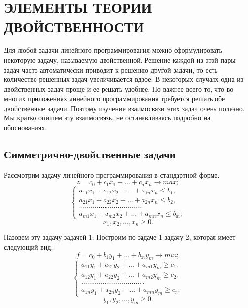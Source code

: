 \section{ЭЛЕМЕНТЫ ТЕОРИИ ДВОЙСТВЕННОСТИ}

Для любой задачи линейного программирования можно сформулировать некоторую задачу, называемую двойственной. Решение каждой из этой пары задач часто  автоматически приводит к решению другой задачи, то есть количество решенных задач увеличивается вдвое. В некоторых случаях одна из  двойственных  задач проще и ее решать удобнее. Но важнее всего то, что во многих приложениях линейного программирования требуется решать обе двойственные задачи.  Поэтому изучение взаимосвязи этих задач очень полезно. Мы кратко опишем эту взаимосвязь, не останавливаясь подробно на обоснованиях.

\subsection{Симметрично-двойственные задачи}

Рассмотрим задачу линейного программирования в стандартной  форме.
\[
z = c_0 + c_1x_1 + \ldots + c_nx_n \rightarrow max;
\]
\[
\begin{cases}
a_{11}x_1 + a_{12}x_2 + \ldots + a_{1n}x_n \le b_1, \\
a_{21}x_1 + a_{22}x_2 + \ldots + a_{2n}x_n \le b_2, \\
\ldots\ldots\ldots\ldots\ldots\ldots\ldots\ldots\ldots\ldots\ldots \\
a_{m1}x_1 + a_{m2}x_2 + \ldots + a_{mn}x_n \le b_m;
\end{cases}
\]
\[ x_1, x_2, \ldots, x_n \ge 0. \]

Назовем эту задачу задачей 1. Построим по задаче 1 задачу 2, которая имеет следующий вид:
\[
f = c_0 + b_1y_1 + \ldots + b_my_m \rightarrow min;
\]
\[
\begin{cases}
a_{11}y_1 + a_{21}y_2 + \ldots + a_{m1}y_m \ge c_1, \\
a_{12}y_1 + a_{22}y_2 + \ldots + a_{m2}y_m \ge c_2, \\
\ldots\ldots\ldots\ldots\ldots\ldots\ldots\ldots\ldots\ldots\ldots \\
a_{1n}y_1 + a_{2n}y_2 + \ldots + a_{mn}y_m \ge c_n;
\end{cases}
\]
\[
y_1, y_2, \ldots, y_m \ge 0.
\]


